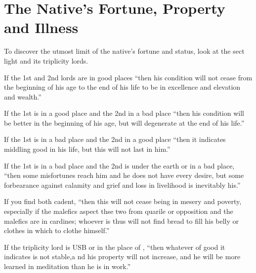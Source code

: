 \section{The Native's Fortune, Property and Illness}
To discover the utmost limit of the native's fortune and status, look at the sect light and its triplicity lords.

If the 1st and 2nd lords are in good places ``then his condition will not cease from the beginning of his age to the end of his life to be in excellence and elevation and wealth.''

If the 1st is in a good place and the 2nd in a bad place ``then his condition will be better in the beginning of his age, but will degenerate at the end of his life.''

If the 1st is in a bad place and the 2nd in a good place ``then it indicates middling good in his life, but this will not last in him.''

If the 1st is in a bad place and the 2nd is under the earth or in a bad place, ``then some misfortunes reach him and he does not have every desire, but some forbearance against calamity and grief and loss in livelihood is inevitably his.''

If you find both cadent, ``then this will not cease being in mesery and poverty, especially if the malefics aspect thse two from quarile or opposition and the malefics are in cardines; whoever is thus will not find bread to fill his belly or clothes in which to clothe himself.''

If the triplicity lord is USB or in the place of \Saturn, ``then whatever of good it indicates is not stable,a nd his property will not increase, and he will be more learned in meditation than he is in work.''